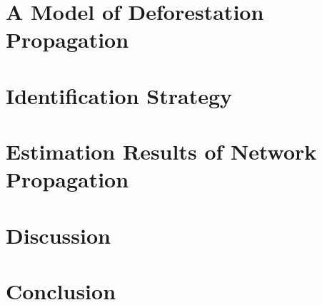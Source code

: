 \documentclass[a4paper,12pt]{article}
\begin{document}
\section{A Model of Deforestation Propagation}

\section{Identification Strategy}

\section{Estimation Results of Network Propagation}

\section{Discussion}

\section{Conclusion}


\end{document}
